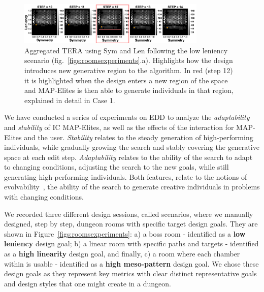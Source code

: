 

\begin{figure}[t!]
\centerline{\includegraphics[width=0.8\textwidth]{figures/exp1-lowlen-exploring_new_area/accumulative__X-sym-Y-len-simplified-2.png}}
\caption{Aggregated TERA using Sym and Len following the low leniency scenario (fig.~\ref{figs:roomsexperiments}.a). Highlights how the design introduces new generative region to the algorithm. In red (step 12) it is highlighted when the design enters a new region of the space and MAP-Elites is then able to generate individuals in that region, explained in detail in Case 1.}
\label{figs:exp1}
\end{figure}

We have conducted a series of experiments on EDD to analyze the \emph{adaptability} and \emph{stability} of IC MAP-Elites, as well as the effects of the interaction for MAP-Elites and the user. \emph{Stability} relates to the steady generation of high-performing individuals, while gradually growing the search and stably covering the generative space at each edit step. \emph{Adaptability} relates to the ability of the search to adapt to changing conditions, adjusting the search to the new goals, while still generating high-performing individuals. Both features, relate to the notions of evolvability~\cite{p9doncieux2020-noveltyEvolvability}, the ability of the search to generate creative individuals in problems with changing conditions.


We recorded three different design sessions, called scenarios, where we manually designed, step by step, dungeon rooms with specific target design goals. They are shown in Figure~\ref{figs:roomsexperiments}: a) a boss room - identified as a \textbf{low leniency} design goal; b) a linear room with specific paths and targets - identified as a \textbf{high linearity} design goal, and finally, c) a room where each chamber within is usable - identified as a \textbf{high meso-pattern} design goal. We chose these design goals as they represent key metrics with clear distinct representative goals and design styles that one might create in a dungeon.

